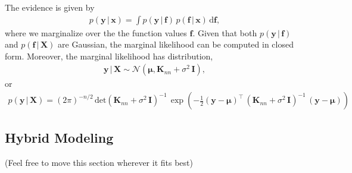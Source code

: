 \documentclass[journal=jacsat,manuscript=article]{achemso}
\newcommand{\alltodo}[1]{{\color{cyan} (#1)}}
\newcommand{\xvec}{\ensuremath{\mathbf{x}}}
\begin{document}
{The evidence is given by
\begin{gather}
    p(\mathbf{y}\, | \, \xvec) = \int p(\mathbf{y}\, | \, \mathbf{f}) \,  p(\mathbf{f}\, | \, \xvec) \, \text{d}\mathbf{f},
\end{gather}
where we marginalize over the the function values $\mathbf{f}$. Given that both $p(\mathbf{y}\, | \, \mathbf{f})$ and $ p(\mathbf{f}\, | \, \mathbf{X})$ are Gaussian, the marginal likelihood can be computed in closed form. Moreover, the marginal likelihood has distribution,
\begin{gather}
    \mathbf{y}\, | \, \mathbf{X} \sim \mathcal{N}(\boldsymbol{\mu}, \mathbf{K}_{nn} + \sigma^2 \,\mathbf{I}),
\end{gather}
or
\begin{gather}
    p(\mathbf{y}\, | \, \mathbf{X}) = (2\pi)^{-n/2}\,\text{det}(\mathbf{K}_{nn} + \sigma^2 \,\mathbf{I})^{-1}\,\exp \left( -\frac{1}{2}(\mathbf{y}-\boldsymbol{\mu})^\intercal \, (\mathbf{K}_{nn} + \sigma^2 \,\mathbf{I})^{-1}\,(\mathbf{y}-\boldsymbol{\mu})\right)
\end{gather}
}

\subsection{Hybrid Modeling}
\alltodo{Feel free to move this section wherever it fits best}\\
\end{document}

